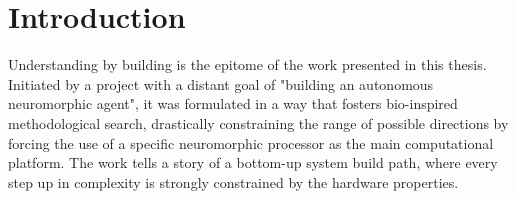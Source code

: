 

\chapter{Introduction}
\label{chapter:introduction}

Understanding by building is the epitome of the work presented in this thesis. Initiated by a project with a distant goal of "building an autonomous neuromorphic agent", it was formulated in a way that fosters bio-inspired methodological search, drastically constraining the range of possible directions by forcing the use of a specific neuromorphic processor as the main computational platform. The work tells a story of a bottom-up system build path, where every step up in complexity is strongly constrained by the hardware properties.

